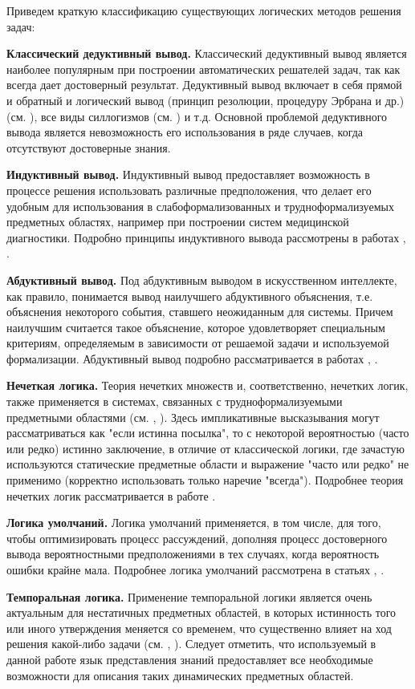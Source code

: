 Приведем краткую классификацию существующих логических методов решения задач:
\begin{textitemize}
	\item{\textbf{Классический дедуктивный вывод.} Классический дедуктивный вывод является наиболее популярным при построении автоматических решателей задач, так как всегда дает достоверный результат. Дедуктивный вывод включает в себя прямой и обратный и логический вывод (принцип резолюции, процедуру Эрбрана и др.) (см. ), все виды силлогизмов (см. ) и т.д. Основной проблемой дедуктивного вывода является невозможность его использования в ряде случаев, когда отсутствуют достоверные знания.}
	\item{\textbf{Индуктивный вывод.} Индуктивный вывод предоставляет возможность в процессе решения использовать различные предположения, что делает его удобным для использования в слабоформализованных и трудноформализуемых предметных областях, например при построении систем медицинской диагностики. Подробно принципы индуктивного вывода рассмотрены в работах , .}
	\item{\textbf{Абдуктивный вывод.} Под абдуктивным выводом в искусственном интеллекте, как правило, понимается вывод наилучшего абдуктивного объяснения, т.е. объяснения некоторого события, ставшего неожиданным для системы. Причем наилучшим считается такое объяснение, которое удовлетворяет специальным критериям, определяемым в зависимости от решаемой задачи и используемой	формализации. Абдуктивный вывод подробно рассматривается в работах , .}
	\item{\textbf{Нечеткая логика.} Теория нечетких множеств и, соответственно, нечетких логик, также применяется в системах, связанных с трудноформализуемыми предметными областями (см. , ). Здесь импликативные высказывания могут рассматриваться как "если истинна посылка"{}, то с некоторой вероятностью (часто или редко) истинно заключение, в отличие от классической логики, где зачастую используются статические предметные области и выражение "часто или редко"{} не применимо (корректно использовать только наречие "всегда"{}). Подробнее теория нечетких логик рассматривается в работе .}
	\item{\textbf{Логика умолчаний.} Логика умолчаний применяется, в том числе, для того, чтобы оптимизировать процесс рассуждений,	дополняя процесс достоверного вывода вероятностными  предположениями в тех случаях, когда вероятность ошибки крайне мала. Подробнее логика умолчаний рассмотрена в статьях , .}
	\item{\textbf{Темпоральная логика.} Применение темпоральной логики является очень актуальным для нестатичных предметных областей, в которых истинность того или иного утверждения меняется со временем, что существенно влияет на ход решения какой-либо задачи (см. , ). Следует отметить, что используемый в данной работе язык представления знаний предоставляет все необходимые возможности для описания таких динамических предметных областей.}
\end{textitemize}

